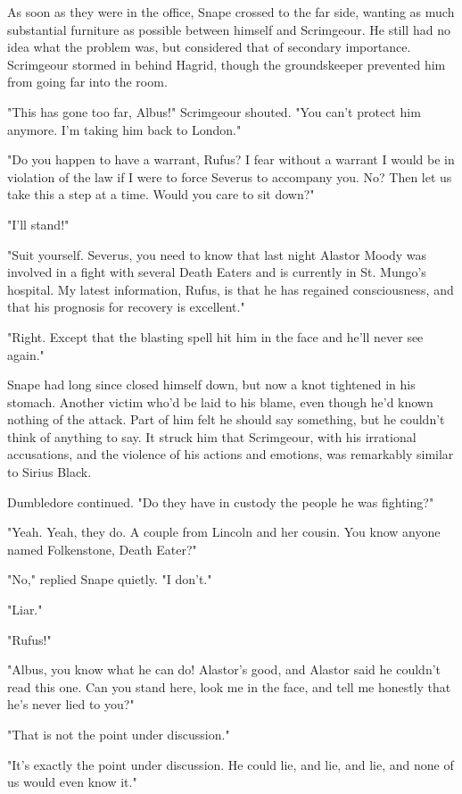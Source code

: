 As soon as they were in the office, Snape crossed to the far side, wanting as much substantial furniture as possible between himself and Scrimgeour. He still had no idea what the problem was, but considered that of secondary importance. Scrimgeour stormed in behind Hagrid, though the groundskeeper prevented him from going far into the room.

"This has gone too far, Albus!" Scrimgeour shouted. "You can't protect him anymore. I'm taking him back to London."

"Do you happen to have a warrant, Rufus? I fear without a warrant I would be in violation of the law if I were to force Severus to accompany you. No? Then let us take this a step at a time. Would you care to sit down?"

"I'll stand!"

"Suit yourself. Severus, you need to know that last night Alastor Moody was involved in a fight with several Death Eaters and is currently in St. Mungo's hospital. My latest information, Rufus, is that he has regained consciousness, and that his prognosis for recovery is excellent."

"Right. Except that the blasting spell hit him in the face and he'll never see again."

Snape had long since closed himself down, but now a knot tightened in his stomach. Another victim who'd be laid to his blame, even though he'd known nothing of the attack. Part of him felt he should say something, but he couldn't think of anything to say. It struck him that Scrimgeour, with his irrational accusations, and the violence of his actions and emotions, was remarkably similar to Sirius Black.

Dumbledore continued. "Do they have in custody the people he was fighting?"

"Yeah. Yeah, they do. A couple from Lincoln and her cousin. You know anyone named Folkenstone, Death Eater?"

"No," replied Snape quietly. "I don't."

"Liar."

"Rufus!"

"Albus, you know what he can do! Alastor's good, and Alastor said he couldn't read this one. Can you stand here, look me in the face, and tell me honestly that he's never lied to you?"

"That is not the point under discussion."

"It's exactly the point under discussion. He could lie, and lie, and lie, and none of us would even know it."

